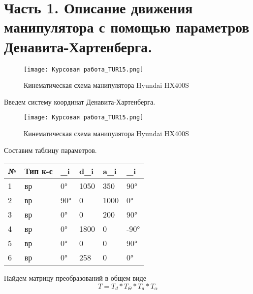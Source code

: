 \documentclass[a4paper]{article}
\begin{document}
	\section{Часть 1. Описание движения манипулятора с помощью параметров Денавита-Хартенберга. }
	\begin{figure}[h]
		\centering
		\texttt{[image: Курсовая работа\_TUR15.png]}
		\caption{Кинематическая схема манипулятора Hyundai HX400S}
		\label{fig:mesh3}
	\end{figure}
	Введем систему координат Денавита-Хартенберга.
	\hfill \break
	\hfill \break
	\begin{figure}[h]
		\centering
		\texttt{[image: Курсовая работа\_TUR15.png]}
		\caption{Кинематическая схема манипулятора Hyundai HX400S}
		\label{fig:mesh3}
	\end{figure}
	\hfill \break
	\hfill \break
	\hfill \break
	Составим таблицу параметров.
	\hfill \break
	\hfill \break
	\centering
	\begin{center}
		\begin{tabular}[c]{l|l|l|l|l|l}
			\textbf{№} & Тип к-с & \Theta_i & d_i & a_i & 	\alpha_i \\[2mm]\hline
			1 & вр & 0°& 1050 &  350 & 90°\\
			2 & вр & 90°& 0 & 1000 & 0° \\
			3 & вр & 0°& 0 & 200 & 90°  \\
			4 & вр & 0°& 1800 & 0 & -90°  \\
			5 & вр & 0°& 0 & 0 & 90°  \\
			6 & вр & 0°& 258 & 0 & 0°  \\
		\end{tabular}
	\end{center}
	\hfill \break
	\hfill \break
	Найдем матрицу преобразований в общем виде
	\hfill \break
	\hfill \break
	\begin{equation}
		T = T_d*T_\Theta*T_a*T_\alpha
	\end{equation}
	\hfill \break
	\hfill \break
\end{document}
